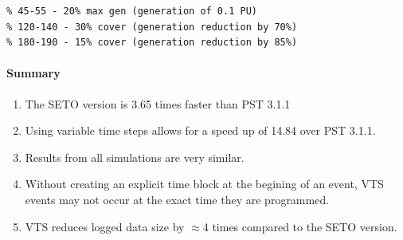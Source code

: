 \documentclass[12pt]{article}
\begin{document}
\begin{center}
\begin{minipage}{.47\linewidth}
\begin{itemize}
\begin{Verbatim}[fontsize=\scriptsize]
% cloud cover events
% 45-55 - 20% max gen (generation of 0.1 PU)
% 120-140 - 30% cover (generation reduction by 70%)
% 180-190 - 15% cover (generation reduction by 85%)
\end{Verbatim}
\end{itemize}
\end{minipage}

\end{center}

\paragraph{Summary} 
\begin{enumerate}
\item The SETO version is 3.65 times faster than PST 3.1.1
\item Using variable time steps allows for a speed up of 14.84 over PST 3.1.1.
\item Results from all simulations are very similar.
\item Without creating an explicit time block at the begining of an event, VTS events may not occur at the exact time they are programmed.
\item VTS reduces logged data size by $\approx$4 times compared to the SETO version.
\end{enumerate}
\end{document}
